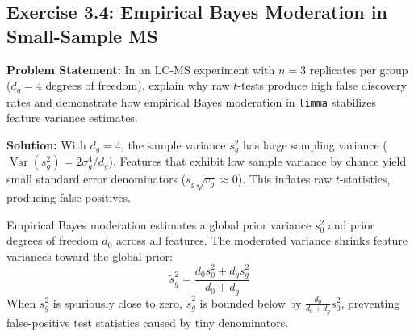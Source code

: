 \documentclass[11pt,twoside,openright]{book}
\begin{document}
\subsection*{Exercise 3.4: Empirical Bayes Moderation in Small-Sample MS}
\noindent\textbf{Problem Statement:}\enspace
In an LC-MS experiment with $n = 3$ replicates per group ($d_g = 4$ degrees of freedom), explain why raw $t$-tests produce high false discovery rates and demonstrate how empirical Bayes moderation in \texttt{limma} stabilizes feature variance estimates.

\noindent\textbf{Solution:}\enspace
With $d_g = 4$, the sample variance $s_g^2$ has large sampling variance ($\operatorname{Var}(s_g^2) = 2\sigma_g^4 / d_g$). Features that exhibit low sample variance by chance yield small standard error denominators ($s_g \sqrt{v_g} \approx 0$). This inflates raw $t$-statistics, producing false positives.

Empirical Bayes moderation estimates a global prior variance $s_0^2$ and prior degrees of freedom $d_0$ across all features. The moderated variance shrinks feature variances toward the global prior:
\begin{equation}
\tilde{s}_g^2 = \frac{d_0 s_0^2 + d_g s_g^2}{d_0 + d_g}
\end{equation}
When $s_g^2$ is spuriously close to zero, $\tilde{s}_g^2$ is bounded below by $\frac{d_0}{d_0 + d_g} s_0^2$, preventing false-positive test statistics caused by tiny denominators.
\end{document}

